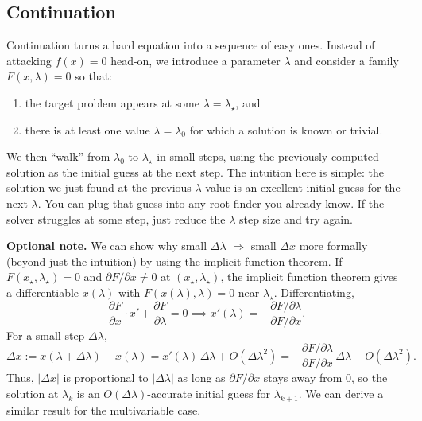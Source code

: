 \subsection{Continuation}

Continuation turns a hard equation into a sequence of easy ones. Instead of attacking $f(x)=0$ head-on, we introduce a parameter $\lambda$ and consider a family $F(x,\lambda)=0$ so that:

\begin{enumerate}
\item the target problem appears at some $\lambda=\lambda_\star$, and
\item there is at least one value $\lambda=\lambda_0$ for which a solution is known or trivial.
\end{enumerate}

We then ``walk'' from $\lambda_0$ to $\lambda_\star$ in small steps, using the previously computed solution as the initial guess at the next step. The intuition here is simple: the solution we just found at the previous $\lambda$ value is an excellent initial guess for the next $\lambda$. You can plug that guess into any root finder you already know. If the solver struggles at some step, just reduce the $\lambda$ step size and try again.

\textbf{Optional note.}\quad
We can show why small $\Delta\lambda$ $\Rightarrow$ small $\Delta x$ more formally (beyond just the intuition) by using the implicit function theorem. If $F(x_\star,\lambda_\star)=0$ and $\partial F/\partial x\neq 0$ at $(x_\star,\lambda_\star)$, the implicit function theorem gives a differentiable $x(\lambda)$ with $F(x(\lambda),\lambda)=0$ near $\lambda_\star$. Differentiating,
\begin{equation}
\frac{\partial F}{\partial x}\cdot x' + \frac{\partial F}{\partial \lambda} = 0 \implies x'(\lambda) = -\frac{\partial F/\partial \lambda}{\partial F/\partial x}.
\end{equation}
For a small step $\Delta\lambda$,
\begin{equation}
\Delta x := x(\lambda+\Delta\lambda)-x(\lambda)
= x'(\lambda)\,\Delta\lambda + O(\Delta\lambda^2)
= -\frac{\partial F/\partial \lambda}{\partial F/\partial x}\,\Delta\lambda + O(\Delta\lambda^2).
\end{equation}
Thus, $|\Delta x|$ is proportional to $|\Delta\lambda|$ as long as $\partial F/\partial x$ stays away from $0$, so the solution at $\lambda_k$ is an $O(\Delta\lambda)$-accurate initial guess for $\lambda_{k+1}$. We can derive a similar result for the multivariable case.

